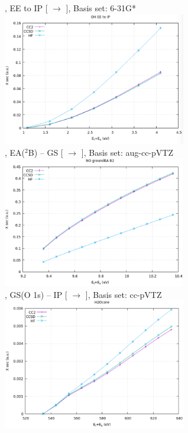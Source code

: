\vfill
{}, EE to IP [ $\longrightarrow$ ], Basis set: 6-31G*
\includegraphics[width=0.6\textwidth]{chapters/appendix/image/OH-.png}\\
\vfill
{}, EA($^2$B) -- GS [ $\longrightarrow$ ], Basis set: aug-cc-pVTZ
\includegraphics[width=0.6\textwidth]{chapters/appendix/image/NO.png}\\
\vfill
{}, GS(O 1s) -- IP [ $\longrightarrow$ ], Basis set: cc-pVTZ
\includegraphics[width=0.6\textwidth]{chapters/appendix/image/H2O.png}\\
\vfill
\clearpage

